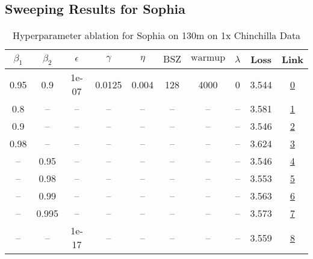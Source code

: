 \subsection{Sweeping Results for Sophia}%
\begin{table}[H]
\centering
\caption{Hyperparameter ablation for Sophia on 130m on 1x Chinchilla Data}
\label{tab:ablation_sophia_130m_1}
\begin{tabular}{cccccccccc}
\toprule
$\beta_1$ & $\beta_2$ & $\epsilon$ & $\gamma$ & $\eta$ & $\mathrm{BSZ}$ & $\mathrm{warmup}$ & $\lambda$ & Loss & Link \\
\midrule
0.95 & 0.9 & 1e-07 & 0.0125 & 0.004 & 128 & 4000 & 0 & 3.544 & \href{https://wandb.ai/stanford-mercury/optimizer-scaling/runs/sweep-130m-2B-sophiag67fd60lr0.004-wd0-minlr0-warmup4000-b10.95--7bdb33}{0} \\
\midrule
0.8 & -- & -- & -- & -- & -- & -- & -- & 3.581 & \href{https://wandb.ai/stanford-mercury/optimizer-scaling/runs/sweep-130m-2B-sophiagf9d750lr0.004-wd0-minlr0-warmup4000-b10.8-b-1d728f}{1} \\
0.9 & -- & -- & -- & -- & -- & -- & -- & 3.546 & \href{https://wandb.ai/stanford-mercury/optimizer-scaling/runs/sweep-130m-2B-sophiau81957flr0.004-wd0-minlr0-warmup4000-b10.9-b-743aad}{2} \\
0.98 & -- & -- & -- & -- & -- & -- & -- & 3.624 & \href{https://wandb.ai/stanford-mercury/optimizer-scaling/runs/sweep-130m-2B-sophiagcf99e7lr0.004-wd0-minlr0-warmup4000-b10.98--b5b74a}{3} \\
-- & 0.95 & -- & -- & -- & -- & -- & -- & 3.546 & \href{https://wandb.ai/stanford-mercury/optimizer-scaling/runs/sweep-130m-2B-sophiaud75557lr0.004-wd0-minlr0-warmup4000-b10.95--9bc769}{4} \\
-- & 0.98 & -- & -- & -- & -- & -- & -- & 3.553 & \href{https://wandb.ai/stanford-mercury/optimizer-scaling/runs/sweep-130m-2B-sophiag5970d9lr0.004-wd0-minlr0-warmup4000-b10.95--d5a961}{5} \\
-- & 0.99 & -- & -- & -- & -- & -- & -- & 3.563 & \href{https://wandb.ai/stanford-mercury/optimizer-scaling/runs/sweep-130m-2B-sophiagceaccflr0.004-wd0-minlr0-warmup4000-b10.95--4fb41c}{6} \\
-- & 0.995 & -- & -- & -- & -- & -- & -- & 3.573 & \href{https://wandb.ai/stanford-mercury/optimizer-scaling/runs/sweep-130m-2B-sophiauf73bb0lr0.004-wd0-minlr0-warmup4000-b10.95--c36e04}{7} \\
-- & -- & 1e-17 & -- & -- & -- & -- & -- & 3.559 & \href{https://wandb.ai/stanford-mercury/optimizer-scaling/runs/sweep-130m-2B-sophiag262464lr0.004-wd0-minlr0-warmup4000-b10.95--b0ffca}{8} \\

\end{tabular}
\end{table}
